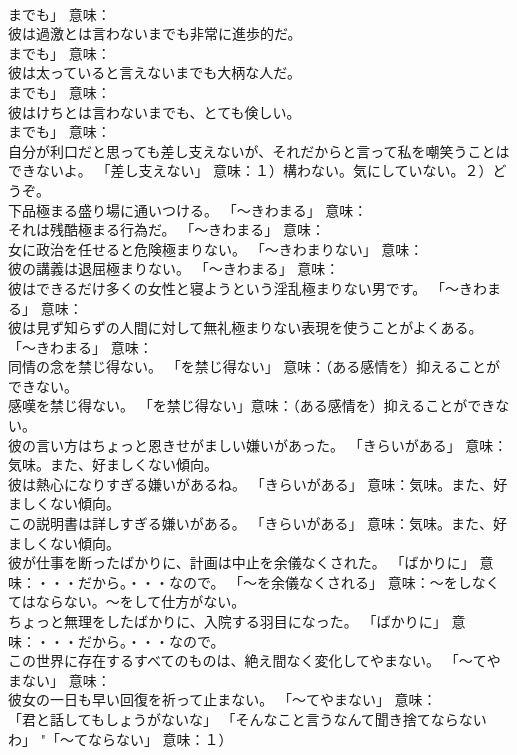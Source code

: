 \documentclass[8pt]{extreport}
\begin{document}
\begin{CJK}{UTF8}{min}
\\	までも」 意味：
\\	彼は過激とは言わないまでも非常に進歩的だ。	
\\	までも」 意味：
\\	彼は太っていると言えないまでも大柄な人だ。	
\\	までも」 意味：
\\	彼はけちとは言わないまでも、とても倹しい。	
\\	までも」 意味：
\\	自分が利口だと思っても差し支えないが、それだからと言って私を嘲笑うことはできないよ。	「差し支えない」 意味：１）構わない。気にしていない。２）どうぞ。	
\\	下品極まる盛り場に通いつける。	「～きわまる」 意味：
\\	それは残酷極まる行為だ。	「～きわまる」 意味：
\\	女に政治を任せると危険極まりない。	「～きわまりない」 意味：
\\	彼の講義は退屈極まりない。	「～きわまる」 意味：
\\	彼はできるだけ多くの女性と寝ようという淫乱極まりない男です。	「～きわまる」 意味：
\\	彼は見ず知らずの人間に対して無礼極まりない表現を使うことがよくある。	「～きわまる」 意味：
\\	同情の念を禁じ得ない。	「を禁じ得ない」 意味：（ある感情を）抑えることができない。	
\\	感嘆を禁じ得ない。	「を禁じ得ない」意味：（ある感情を）抑えることができない。	
\\	彼の言い方はちょっと恩きせがましい嫌いがあった。	「きらいがある」 意味：気味。また、好ましくない傾向。	
\\	彼は熱心になりすぎる嫌いがあるね。	「きらいがある」 意味：気味。また、好ましくない傾向。	
\\	この説明書は詳しすぎる嫌いがある。	「きらいがある」 意味：気味。また、好ましくない傾向。	
\\	彼が仕事を断ったばかりに、計画は中止を余儀なくされた。	「ばかりに」 意味：・・・だから。・・・なので。 「～を余儀なくされる」 意味：～をしなくてはならない。～をして仕方がない。	
\\	ちょっと無理をしたばかりに、入院する羽目になった。	「ばかりに」 意味：・・・だから。・・・なので。	
\\	この世界に存在するすべてのものは、絶え間なく変化してやまない。	「～てやまない」 意味：
\\	彼女の一日も早い回復を祈って止まない。	「～てやまない」 意味：
\\	「君と話してもしょうがないな」 「そんなこと言うなんて聞き捨てならないわ」	"「～てならない」 意味：１）

\end{CJK}
\end{document}
